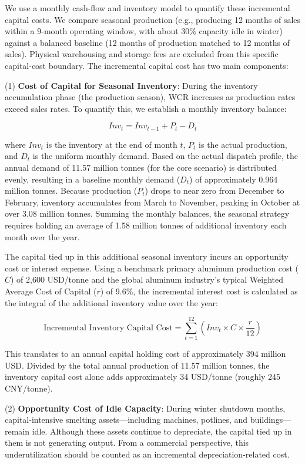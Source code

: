 \documentclass[preprint,12pt]{elsarticle}
\begin{document}
We use a monthly cash-flow and inventory model to quantify these incremental capital costs. We compare seasonal production (e.g., producing 12 months of sales within a 9-month operating window, with about 30\% capacity idle in winter) against a balanced baseline (12 months of production matched to 12 months of sales). Physical warehousing and storage fees are excluded from this specific capital-cost boundary. The incremental capital cost has two main components:

(1) \textbf{Cost of Capital for Seasonal Inventory}: During the inventory accumulation phase (the production season), WCR increases as production rates exceed sales rates. To quantify this, we establish a monthly inventory balance:


$$Inv_t = Inv_{t-1} + P_t - D_t$$


where $Inv_t$ is the inventory at the end of month $t$, $P_t$ is the actual production, and $D_t$ is the uniform monthly demand. Based on the actual dispatch profile, the annual demand of 11.57 million tonnes (for the core scenario) is distributed evenly, resulting in a baseline monthly demand ($D_t$) of approximately 0.964 million tonnes. Because production ($P_t$) drops to near zero from December to February, inventory accumulates from March to November, peaking in October at over 3.08 million tonnes. Summing the monthly balances, the seasonal strategy requires holding an average of 1.58 million tonnes of additional inventory each month over the year.

The capital tied up in this additional seasonal inventory incurs an opportunity cost or interest expense. Using a benchmark primary aluminum production cost ($C$) of 2,600 USD/tonne and the global aluminum industry's typical Weighted Average Cost of Capital ($r$) of 9.6\%, the incremental interest cost is calculated as the integral of the additional inventory value over the year:


$$\text{Incremental Inventory Capital Cost} = \sum_{t=1}^{12} \left( Inv_t \times C \times \frac{r}{12} \right)$$


This translates to an annual capital holding cost of approximately 394 million USD. Divided by the total annual production of 11.57 million tonnes, the inventory capital cost alone adds approximately 34 USD/tonne (roughly 245 CNY/tonne).

(2) \textbf{Opportunity Cost of Idle Capacity}: During winter shutdown months, capital-intensive smelting assets---including machines, potlines, and buildings---remain idle. Although these assets continue to depreciate, the capital tied up in them is not generating output. From a commercial perspective, this underutilization should be counted as an incremental depreciation-related cost.
\end{document}
